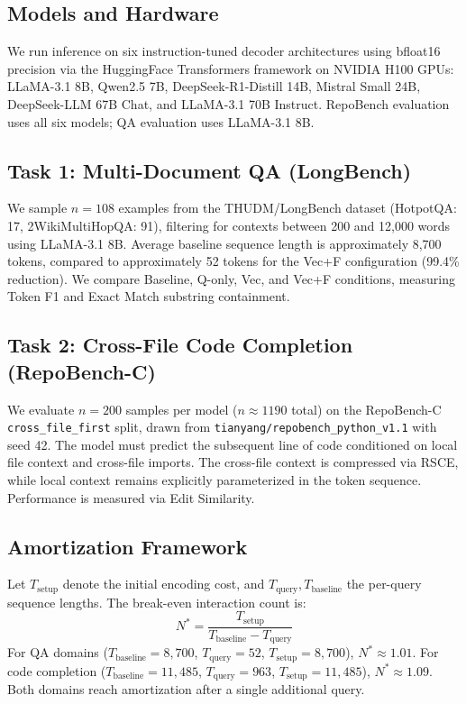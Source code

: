 \documentclass[11pt]{article}
\begin{document}
\subsection{Models and Hardware}
We run inference on six instruction-tuned decoder architectures using bfloat16 precision via the HuggingFace Transformers framework on NVIDIA H100 GPUs: LLaMA-3.1 8B, Qwen2.5 7B, DeepSeek-R1-Distill 14B, Mistral Small 24B, DeepSeek-LLM 67B Chat, and LLaMA-3.1 70B Instruct. RepoBench evaluation uses all six models; QA evaluation uses LLaMA-3.1 8B.

\subsection{Task 1: Multi-Document QA (LongBench)}
We sample $n = 108$ examples from the THUDM/LongBench dataset (HotpotQA: 17, 2WikiMultiHopQA: 91), filtering for contexts between 200 and 12,000 words using LLaMA-3.1 8B. Average baseline sequence length is approximately 8,700 tokens, compared to approximately 52 tokens for the Vec+F configuration (99.4\% reduction). We compare Baseline, Q-only, Vec, and Vec+F conditions, measuring Token F1 and Exact Match substring containment.

\subsection{Task 2: Cross-File Code Completion (RepoBench-C)}
We evaluate $n = 200$ samples per model ($n \approx 1190$ total) on the RepoBench-C \texttt{cross\_file\_first} split, drawn from \texttt{tianyang/repobench\_python\_v1.1} with seed 42. The model must predict the subsequent line of code conditioned on local file context and cross-file imports. The cross-file context is compressed via RSCE, while local context remains explicitly parameterized in the token sequence. Performance is measured via Edit Similarity.

\subsection{Amortization Framework}
Let $T_\text{setup}$ denote the initial encoding cost, and $T_\text{query}, T_\text{baseline}$ the per-query sequence lengths. The break-even interaction count is:
\[
    N^* = \frac{T_\text{setup}}{T_\text{baseline} - T_\text{query}}
\]
For QA domains ($T_\text{baseline} = 8{,}700$, $T_\text{query} = 52$, $T_\text{setup} = 8{,}700$), $N^* \approx 1.01$. For code completion ($T_\text{baseline} = 11{,}485$, $T_\text{query} = 963$, $T_\text{setup} = 11{,}485$), $N^* \approx 1.09$. Both domains reach amortization after a single additional query.
\end{document}
